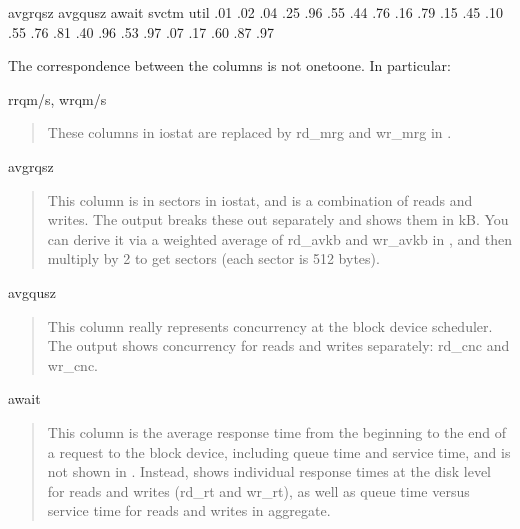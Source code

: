 \documentclass[letterpaper,10pt,english]{sphinxmanual}
\begin{document}
\begin{sphinxVerbatim}[commandchars=\\\{\}]
                avgrq\PYGZhy{}sz avgqu\PYGZhy{}sz  await  svctm  \PYGZpc{}util
                   .01     .02   .04   .25   .96
                   .55     .44  .76   .16   .79
                   .15     .45  .10   .55  .76
                   .81    .40  .96   .53  .97
                   .07     .17  .60   .87   .97
\end{sphinxVerbatim}

The correspondence between the columns is not one\sphinxhyphen{}to\sphinxhyphen{}one.  In particular:

rrqm/s, wrqm/s
\begin{quote}

These columns in iostat are replaced by rd\_mrg and wr\_mrg in .
\end{quote}

avgrq\sphinxhyphen{}sz
\begin{quote}

This column is in sectors in iostat, and is a combination of reads and writes.
The  output breaks these out separately and shows them in kB.  You
can derive it via a weighted average of rd\_avkb and wr\_avkb in , and
then multiply by 2 to get sectors (each sector is 512 bytes).
\end{quote}

avgqu\sphinxhyphen{}sz
\begin{quote}

This column really represents concurrency at the block device scheduler.  The
 output shows concurrency for reads and writes separately: rd\_cnc
and wr\_cnc.
\end{quote}

await
\begin{quote}

This column is the average response time from the beginning to the end of a
request to the block device, including queue time and service time, and is not
shown in .  Instead,  shows individual response times at
the disk level for reads and writes (rd\_rt and wr\_rt), as well as queue time
versus service time for reads and writes in aggregate.
\end{quote}
\end{document}
